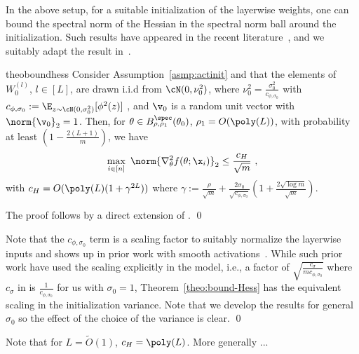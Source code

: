 
In the above setup, for a suitable initialization of the layerwise weights, one can bound the spectral norm of the Hessian in the spectral norm ball around the initialization. Such results have appeared in the recent literature~\cite{CL-LZ-MB:20,CL-LZ-MB:21,AB-PCV-LZ-MB:22}, and we suitably adapt the result in~\citep[Theorem~4.1]{AB-PCV-LZ-MB:22}.

\begin{restatable}{theo}{boundhess}
\label{theo:bound-Hess}
Consider Assumption~\ref{asmp:actinit} and that the elements of $W_0^{(l)}$, $l\in[L]$, are drawn i.i.d from $\cN(0,\nu_0^2)$, where $\nu_0^2 = \frac{\sigma_0^2}{c_{\phi,\sigma_0}}$ with $c_{\phi,\sigma_0} := \E_{z \sim \cN(0,\sigma_0^2)}[\phi^2(z)]$ , and $\v_0$ is a random unit vector with $\norm{\v_0}_2=1$. Then, for $\theta \in B_{\rho,\rho_1}^{\spec}(\theta_0)$, 
$\rho_1=O(\poly(L))$,  with probability at least $(1-\frac{2(L+1)}{m})$, we have 
\begin{equation}
\label{eq:bound_Hessian}
   \max_{i \in [n]} ~\norm{ \nabla^2_\theta f(\theta;\x_i)}_2 \leq \frac{c_H}{\sqrt{m}}~,
\end{equation}
with $c_H = O(\poly(L)(1+\gamma^{2L}))$ where $\gamma := \frac{\rho}{\sqrt{m}} + \frac{2\sigma_0}{\sqrt{c_{\phi,\sigma_0}}} \left(1 + \frac{2 \sqrt{\log m}}{\sqrt{m}} \right) $. \end{restatable}

\proof The proof follows by a direct extension of \citep[Theorem~4.1]{AB-PCV-LZ-MB:22}. \qed 

\begin{remark}
Note that the $c_{\phi,\sigma_0}$ term is a scaling factor to suitably normalize the layerwise inputs and shows up in prior work with smooth activations~\cite{SD-JL-HL-LW-XZ:19}. While such prior work have used the scaling explicitly in the model, i.e., a factor of $\sqrt{\frac{c_{\sigma}}{m c_{\phi,\sigma_0}}}$ where $c_{\sigma}$ in \cite{SD-JL-HL-LW-XZ:19} is $\frac{1}{c_{\phi,\sigma_0}}$ for us with $\sigma_0=1$, Theorem~\ref{theo:bound-Hess} has the equivalent scaling in the initialization variance. Note that we develop the results for general $\sigma_0$ so the effect of the choice of the variance is clear. \qed 
\end{remark}


\begin{remark}
Note that for $L = \tilde{O}(1)$, $c_H = \poly(L)$. More generally ... 
\end{remark}
%

